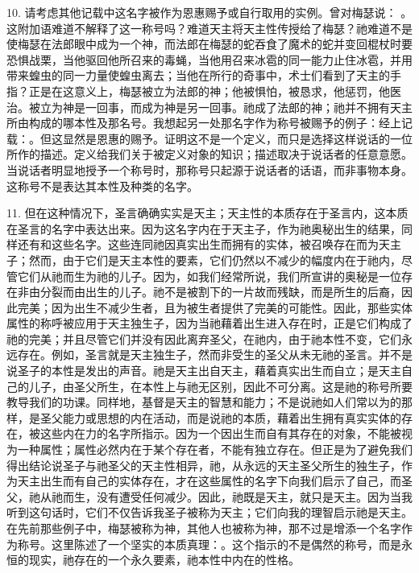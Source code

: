 10. 请考虑其他记载中这名字被作为恩惠赐予或自行取用的实例。曾对梅瑟说： 。这附加语难道不解释了这一称号吗？难道天主将天主性传授给了梅瑟？祂难道不是使梅瑟在法郎眼中成为一个神，而法郎在梅瑟的蛇吞食了魔术的蛇并变回棍杖时要恐惧战栗，当他驱回他所召来的毒蝇，当他用召来冰雹的同一能力止住冰雹，并用带来蝗虫的同一力量使蝗虫离去；当他在所行的奇事中，术士们看到了天主的手指？正是在这意义上，梅瑟被立为法郎的神；他被惧怕，被恳求，他惩罚，他医治。被立为神是一回事，而成为神是另一回事。祂成了法郎的神；祂并不拥有天主所由构成的哪本性及那名号。我想起另一处那名字作为称号被赐予的例子：经上记载：。但这显然是恩惠的赐予。证明这不是一个定义，而只是选择这样说话的一位所作的描述。定义给我们关于被定义对象的知识；描述取决于说话者的任意意愿。当说话者明显地授予一个称号时，那称号只起源于说话者的话语，而非事物本身。这称号不是表达其本性及种类的名字。\par

11. 但在这种情况下，圣言确确实实是天主；天主性的本质存在于圣言内，这本质在圣言的名字中表达出来。因为这名字内在于天主子，作为祂奥秘出生的结果，同样还有和这些名字。这些连同祂因真实出生而拥有的实体，被召唤存在而为天主子；然而，由于它们是天主本性的要素，它们仍然以不减少的幅度内在于祂内，尽管它们从祂而生为祂的儿子。因为，如我们经常所说，我们所宣讲的奥秘是一位存在非由分裂而由出生的儿子。祂不是被割下的一片故而残缺，而是所生的后裔，因此完美；因为出生不减少生者，且为被生者提供了完美的可能性。因此，那些实体属性的称呼被应用于天主独生子，因为当祂藉着出生进入存在时，正是它们构成了祂的完美；并且尽管它们并没有因此离弃圣父，在祂内，由于祂本性不变，它们永远存在。例如，圣言就是天主独生子，然而非受生的圣父从未无祂的圣言。并不是说圣子的本性是发出的声音。祂是天主出自天主，藉着真实出生而自立；是天主自己的儿子，由圣父所生，在本性上与祂无区别，因此不可分离。这是祂的称号所要教导我们的功课。同样地，基督是天主的智慧和能力；不是说祂如人们常以为的那样，是圣父能力或思想的内在活动，而是说祂的本质，藉着出生拥有真实实体的存在，被这些内在力的名字所指示。因为一个因出生而自有其存在的对象，不能被视为一种属性；属性必然内在于某个存在者，不能有独立存在。但正是为了避免我们得出结论说圣子与祂圣父的天主性相异，祂，从永远的天主圣父所生的独生子，作为天主出生而有自己的实体存在，才在这些属性的名字下向我们启示了自己，而圣父，祂从祂而生，没有遭受任何减少。因此，祂既是天主，就只是天主。因为当我听到这句话时，它们不仅告诉我圣子被称为天主；它们向我的理智启示祂是天主。在先前那些例子中，梅瑟被称为神，其他人也被称为神，那不过是增添一个名字作为称号。这里陈述了一个坚实的本质真理：。这个指示的不是偶然的称号，而是永恒的现实，祂存在的一个永久要素，祂本性中内在的性格。\par

